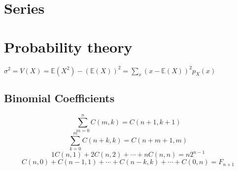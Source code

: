 \section{Series}

\section{Probability theory}
$\sigma^2=V(X)=\mathbb{E}(X^2)-(\mathbb{E}(X))^2=\sum_x(x-\mathbb{E}(X))^2p_X(x)$


\subsection{Binomial Coefficients}
    \[ \sum_{m = 0}^n C(m,k) = C({n + 1},{k + 1}) \]
    \[ \sum_{k = 0}^m  C({n + k},k) = C({n + m + 1},m) \]
    \[ 1 C(n,1) + 2 C(n,2) + \cdots + n C(n,n) = n 2^{n-1} \]
    \[ C(n,0) + C({n-1},1) + \cdots + C({n-k},k) + \cdots + C(0,n) = F_{n+1} \]


